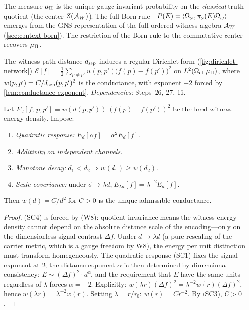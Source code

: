 \begin{remark}
\label{rem:born-rule}
The measure $\mu_\Pi$ is the unique gauge-invariant probability on the
\emph{classical} truth quotient (the center $Z(\mathcal{A}_W)$).  The full Born
rule---$P(E) = \langle \Omega_\omega, \pi_\omega(E) \Omega_\omega \rangle$---emerges
from the GNS representation of the full ordered witness algebra $\mathcal{A}_W$
(\cref{sec:context-born}).  The restriction of the Born rule to the
commutative center recovers $\mu_\Pi$.
\end{remark}

\begin{theorem}
\label{thm:dirichlet-form}
The witness-path distance $d_{\mathrm{sep}}$ induces a regular Dirichlet form
(\cref{fig:dirichlet-network})
$\mathcal{E}[f] = \frac{1}{2} \sum_{p \neq p'} w(p, p') \bigl(f(p) - f(p')\bigr)^2$
on $L^2(\Omega_{\mathrm{cl}}, \mu_\Pi)$, where $w(p, p') = C/d_{\mathrm{sep}}(p,p')^2$ is the
conductance, with exponent $-2$ forced by \cref{lem:conductance-exponent}.
\emph{Dependencies:} Steps~26, 27, 16.
\end{theorem}

\begin{lemma}
\label{lem:conductance-exponent}
Let $E_d[f;\, p, p'] = w(d(p,p'))\,(f(p) - f(p'))^2$ be the local
witness-energy density.  Impose:
\begin{enumerate}[nosep, label=\textup{(SC\arabic*)}]
  \item \emph{Quadratic response:} $E_d[\alpha f] = \alpha^2 E_d[f]$.
  \item \emph{Additivity on independent channels.}
  \item \emph{Monotone decay:} $d_1 < d_2 \Rightarrow w(d_1) \geq w(d_2)$.
  \item \emph{Scale covariance:} under $d \to \lambda d$,
        $E_{\lambda d}[f] = \lambda^{-2} E_d[f]$.
\end{enumerate}
Then $w(d) = C / d^2$ for $C > 0$ is the unique admissible conductance.
\begin{proof}
(SC4) is forced by (W8): quotient invariance means the witness energy
density cannot depend on the absolute distance scale of the encoding---only
on the dimensionless signal contrast $\Delta f$.  Under $d \to \lambda d$
(a pure rescaling of the carrier metric, which is a gauge freedom by W8),
the energy per unit distinction must transform homogeneously.  The
quadratic response (SC1) fixes the signal exponent at $2$; the distance
exponent $\alpha$ is then determined by dimensional consistency:
$E \sim (\Delta f)^2 \cdot d^\alpha$, and the requirement that $E$ have
the same units regardless of $\lambda$ forces $\alpha = -2$.  Explicitly:
$w(\lambda r) (\Delta f)^2 = \lambda^{-2} w(r) (\Delta f)^2$, hence
$w(\lambda r) = \lambda^{-2} w(r)$.  Setting $\lambda = r/r_0$:
$w(r) = C r^{-2}$.  By (SC3), $C > 0$.
\end{proof}
\end{lemma}

